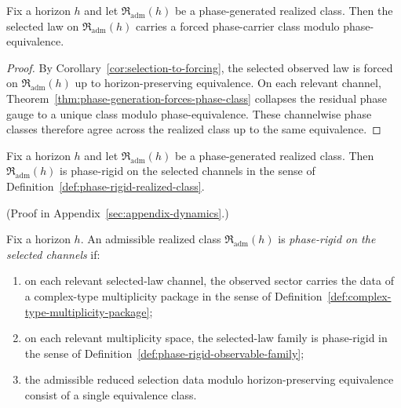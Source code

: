 \begin{corollary}
\label{cor:realized-phase-generation-forcing}
Fix a horizon $h$ and let $\mathfrak R_{\mathrm{adm}}(h)$ be a phase-generated
realized class. Then the selected law on $\mathfrak R_{\mathrm{adm}}(h)$
carries a forced phase-carrier class modulo phase-equivalence.
\end{corollary}

\begin{proof}
By Corollary~\ref{cor:selection-to-forcing}, the selected observed law is
forced on $\mathfrak R_{\mathrm{adm}}(h)$ up to horizon-preserving
equivalence. On each relevant channel,
Theorem~\ref{thm:phase-generation-forces-phase-class} collapses the residual
phase gauge to a unique class modulo phase-equivalence. These channelwise
phase classes therefore agree across the realized class up to the same
equivalence.
\end{proof}

\begin{corollary}
\label{cor:realized-phase-generation-implies-rigidity}
Fix a horizon $h$ and let $\mathfrak R_{\mathrm{adm}}(h)$ be a phase-generated
realized class. Then $\mathfrak R_{\mathrm{adm}}(h)$ is phase-rigid on the
selected channels in the sense of
Definition~\ref{def:phase-rigid-realized-class}.
\end{corollary}

(Proof in Appendix~\ref{sec:appendix-dynamics}.)

\begin{definition}
\label{def:phase-rigid-realized-class}
Fix a horizon $h$. An admissible realized class
$\mathfrak R_{\mathrm{adm}}(h)$ is \emph{phase-rigid on the selected channels}
if:
\begin{enumerate}[label=(\roman*), leftmargin=2em, itemsep=0.2em]
\item on each relevant selected-law channel, the observed sector carries the
      data of a complex-type multiplicity package in the sense of
      Definition~\ref{def:complex-type-multiplicity-package};
\item on each relevant multiplicity space, the selected-law family is
      phase-rigid in the sense of
      Definition~\ref{def:phase-rigid-observable-family};
\item the admissible reduced selection data modulo horizon-preserving
      equivalence consist of a single equivalence class.
\end{enumerate}
\end{definition}

